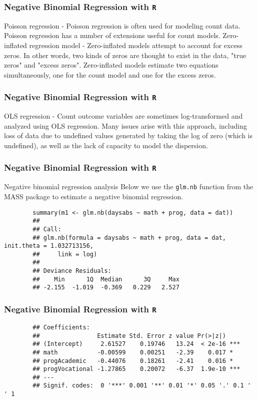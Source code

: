 \documentclass[00-GLMregslides.tex]{subfiles}
\begin{document}
\begin{frame}[fragile]
	\frametitle{Negative Binomial Regression with \texttt{R} }
	\Large
	
	Poisson regression - Poisson regression is often used for modeling count data. Poisson regression has a number of extensions useful for count models.
	Zero-inflated regression model - Zero-inflated models attempt to account for excess zeros. In other words, two kinds of zeros are thought to exist in the data, "true zeros" and "excess zeros". Zero-inflated models estimate two equations simultaneously, one for the count model and one for the excess zeros.
\end{frame}
\begin{frame}[fragile]
	\frametitle{Negative Binomial Regression with \texttt{R} }
	\Large
	
	OLS regression - Count outcome variables are sometimes log-transformed and analyzed using OLS regression. Many issues arise with this approach, including loss of data due to undefined values generated by taking the log of zero (which is undefined), as well as the lack of capacity to model the dispersion.
\end{frame}
\begin{frame}[fragile]
	\frametitle{Negative Binomial Regression with \texttt{R} }
	\Large
	
	Negative binomial regression analysis
	Below we use the \texttt{glm.nb} function from the MASS package to estimate a negative binomial regression.
	
	\begin{framed}
		\begin{verbatim}
		summary(m1 <- glm.nb(daysabs ~ math + prog, data = dat))
		## 
		## Call:
		## glm.nb(formula = daysabs ~ math + prog, data = dat, init.theta = 1.032713156, 
		##     link = log)
		## 
		## Deviance Residuals: 
		##    Min      1Q  Median      3Q     Max  
		## -2.155  -1.019  -0.369   0.229   2.527  
			\end{verbatim}
		\end{framed}
		
	\end{frame}
	\begin{frame}[fragile]
		\frametitle{Negative Binomial Regression with \texttt{R} }
		\Large
		\begin{framed}
			\begin{verbatim} 
		## Coefficients:
		##                Estimate Std. Error z value Pr(>|z|)    
		## (Intercept)     2.61527    0.19746   13.24  < 2e-16 ***
		## math           -0.00599    0.00251   -2.39    0.017 *  
		## progAcademic   -0.44076    0.18261   -2.41    0.016 *  
		## progVocational -1.27865    0.20072   -6.37  1.9e-10 ***
		## ---
		## Signif. codes:  0 '***' 0.001 '**' 0.01 '*' 0.05 '.' 0.1 ' ' 1
		\end{verbatim}
	\end{framed}
	
\end{frame}
\end{document}
